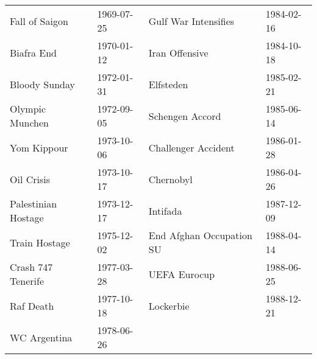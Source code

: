 \begin{tabular}{llll}
       Fall of Saigon &  1969-07-25 &            Gulf War Intensifies &  1984-02-16 \\
           Biafra End &  1970-01-12 &                  Iran Offensive &  1984-10-18 \\
        Bloody Sunday &  1972-01-31 &                       Elfsteden &  1985-02-21 \\
      Olympic Munchen &  1972-09-05 &                 Schengen Accord &  1985-06-14 \\
          Yom Kippour &  1973-10-06 &             Challenger Accident &  1986-01-28 \\
           Oil Crisis &  1973-10-17 &                       Chernobyl &  1986-04-26 \\
  Palestinian Hostage &  1973-12-17 &                        Intifada &  1987-12-09 \\
        Train Hostage &  1975-12-02 &        End Afghan Occupation SU &  1988-04-14 \\
   Crash 747 Tenerife &  1977-03-28 &                    UEFA Eurocup &  1988-06-25 \\
            Raf Death &  1977-10-18 &                       Lockerbie &  1988-12-21 \\
         WC Argentina &  1978-06-26 &                              &          \\
\bottomrule
\end{tabular}
